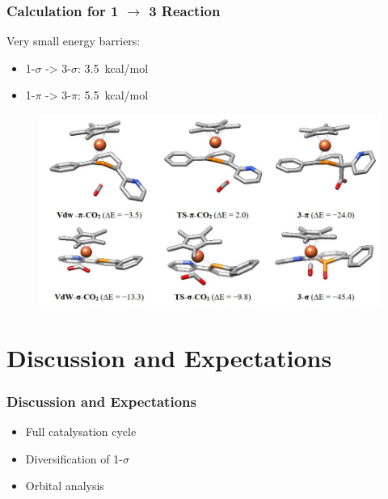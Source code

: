 \documentclass[10pt,aspectratio=43]{beamer}
\numberwithin{equation}{section}
\begin{document}
\begin{frame}
\frametitle{Calculation for 1 $ \rightarrow $ 3 Reaction}
Very small energy barriers:
\begin{itemize}
	\item 1-$ \sigma $ -> 3-$ \sigma $: \SI{3.5}{kcal/mol}
	\item 1-$ \pi $ -> 3-$ \pi $: \SI{5.5}{kcal/mol}
\end{itemize}
\begin{figure}
	\includegraphics[width=0.9\linewidth]{33.jpg}
\end{figure}

\end{frame}



\section{Discussion and Expectations}
\begin{frame}
\frametitle{Discussion and Expectations}
\begin{itemize}
	\item Full catalysation cycle
	\item Diversification of 1-$ \sigma $
	\item Orbital analysis
\end{itemize}

\end{frame}
\end{document}
